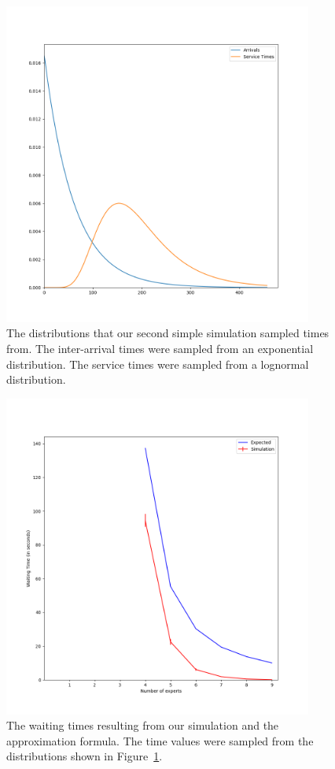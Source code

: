 \begin{figure}[h]
  \includegraphics[width=4in]{figures/montecarlo/expon_lognorm.png}
  \caption{
    The distributions that our second simple simulation sampled times from.
    The inter-arrival times were sampled from an exponential distribution.
    The service times were sampled from a lognormal distribution.
  }\label{fig:simple_sim2_dists}
\end{figure}

\begin{figure}[h]
  \includegraphics[width=4in]{figures/montecarlo/independent_calls_expon.png}
  \caption{
    The waiting times resulting from our simulation and the approximation
    formula.
    The time values were sampled from the distributions shown in
    Figure~\ref{fig:simple_sim2_dists}.
  }\label{fig:simple_sim2_results}
\end{figure}

